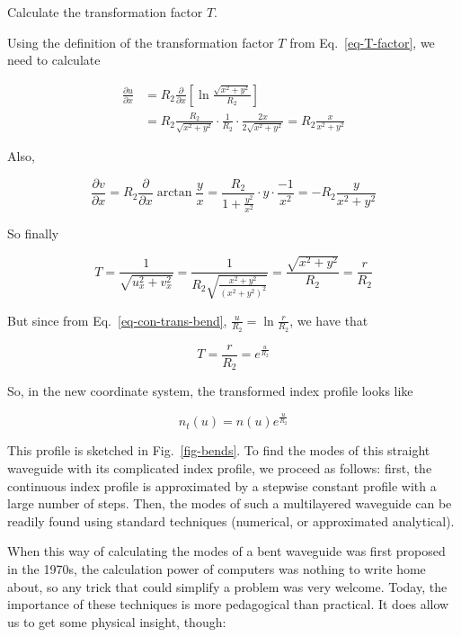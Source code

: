 \begin{cue}
Calculate the transformation factor $T$. 
\end{cue}

Using the definition of the transformation factor $T$ from Eq.~\ref{eq-T-factor}, we need to calculate

\begin{align}
\frac{\partial u}{\partial x} &= R_2 \frac{\partial }{\partial x} \left[ \ln \frac{\sqrt{x^2+y^2}}{R_2} \right] \nonumber \\
&= R_2 \frac{R_2}{\sqrt{x^2+y^2}} \cdot \frac{1}{R_2} \cdot \frac{2x}{2\sqrt{x^2+y^2}} = R_2 \frac{x}{x^2+y^2}
\end{align} 

Also,

\begin{equation}
\frac{\partial v}{\partial x} = R_2 \frac{\partial}{\partial x} \arctan
\frac{y}{x} = \frac{R_2}{1 + \frac{y^2}{x^2}} \cdot y \cdot \frac{-1}{x^2}= -R_2
\frac{y}{x^2+y^2}
\end{equation} 

So finally

\begin{equation}
T = \frac{1}{\sqrt{u_x^2+v_x^2}} = \frac{1}{R_2 \sqrt{\frac{x^2+y^2}{(x^2+y^2)^2}}} = \frac{\sqrt{x^2+y^2}}{R_2} = \frac{r}{R_2}
\end{equation} 

But since from Eq.~\ref{eq-con-trans-bend}, $\frac{u}{R_2}=\ln{\frac{r}{R_2}}$, we have that 

\begin{equation}
T = \frac{r}{R_2} = e^{\frac{u}{R_2}}
\end{equation} 

So, in the new coordinate system, the transformed index profile looks like

\begin{equation}
n_t(u) = n(u)e^{\frac{u}{R_2}}
\end{equation} 

This profile is sketched in Fig.~\ref{fig-bends}. To find the modes of this straight waveguide with its complicated index profile, we proceed as follows: first, the continuous index profile is approximated by a stepwise constant profile with a large number of steps. Then, the modes of such a multilayered waveguide can be readily found using standard techniques (numerical, or approximated analytical).

When this way of calculating the modes of a bent waveguide was first proposed in the 1970s, the calculation power of computers was nothing to write home about, so any trick that could simplify a problem was very welcome. Today, the importance of these techniques is more pedagogical than practical. It does allow us to get some physical insight, though:

